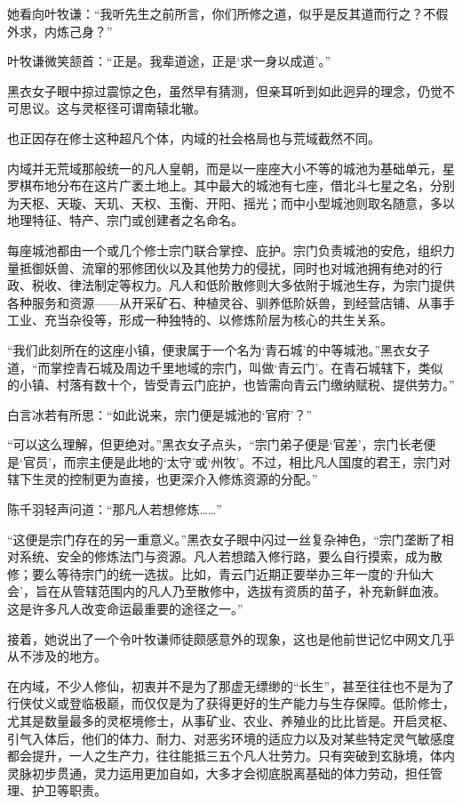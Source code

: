 她看向叶牧谦：“我听先生之前所言，你们所修之道，似乎是反其道而行之？不假外求，内炼己身？”

叶牧谦微笑颔首：“正是。我辈道途，正是‘求一身以成道’。”

黑衣女子眼中掠过震惊之色，虽然早有猜测，但亲耳听到如此迥异的理念，仍觉不可思议。这与灵枢径可谓南辕北辙。

也正因存在修士这种超凡个体，内域的社会格局也与荒域截然不同。

内域并无荒域那般统一的凡人皇朝，而是以一座座大小不等的城池为基础单元，星罗棋布地分布在这片广袤土地上。其中最大的城池有七座，借北斗七星之名，分别为天枢、天璇、天玑、天权、玉衡、开阳、摇光；而中小型城池则取名随意，多以地理特征、特产、宗门或创建者之名命名。

每座城池都由一个或几个修士宗门联合掌控、庇护。宗门负责城池的安危，组织力量抵御妖兽、流窜的邪修团伙以及其他势力的侵扰，同时也对城池拥有绝对的行政、税收、律法制定等权力。凡人和低阶散修则大多依附于城池生存，为宗门提供各种服务和资源——从开采矿石、种植灵谷、驯养低阶妖兽，到经营店铺、从事手工业、充当杂役等，形成一种独特的、以修炼阶层为核心的共生关系。

“我们此刻所在的这座小镇，便隶属于一个名为‘青石城’的中等城池。”黑衣女子道，“而掌控青石城及周边千里地域的宗门，叫做‘青云门’。在青石城辖下，类似的小镇、村落有数十个，皆受青云门庇护，也皆需向青云门缴纳赋税、提供劳力。”

白言冰若有所思：“如此说来，宗门便是城池的‘官府’？”

“可以这么理解，但更绝对。”黑衣女子点头，“宗门弟子便是‘官差’，宗门长老便是‘官员’，而宗主便是此地的‘太守’或‘州牧’。不过，相比凡人国度的君王，宗门对辖下生灵的控制更为直接，也更深介入修炼资源的分配。”

陈千羽轻声问道：“那凡人若想修炼……”

“这便是宗门存在的另一重意义。”黑衣女子眼中闪过一丝复杂神色，“宗门垄断了相对系统、安全的修炼法门与资源。凡人若想踏入修行路，要么自行摸索，成为散修；要么等待宗门的统一选拔。比如，青云门近期正要举办三年一度的‘升仙大会’，旨在从管辖范围内的凡人乃至散修中，选拔有资质的苗子，补充新鲜血液。这是许多凡人改变命运最重要的途径之一。”

接着，她说出了一个令叶牧谦师徒颇感意外的现象，这也是他前世记忆中网文几乎从不涉及的地方。

在内域，不少人修仙，初衷并不是为了那虚无缥缈的“长生”，甚至往往也不是为了行侠仗义或登临极巅，而仅仅是为了获得更好的生产能力与生存保障。低阶修士，尤其是数量最多的灵枢境修士，从事矿业、农业、养殖业的比比皆是。开启灵枢、引气入体后，他们的体力、耐力、对恶劣环境的适应力以及对某些特定灵气敏感度都会提升，一人之生产力，往往能抵三五个凡人壮劳力。只有突破到玄脉境，体内灵脉初步贯通，灵力运用更加自如，大多才会彻底脱离基础的体力劳动，担任管理、护卫等职责。

